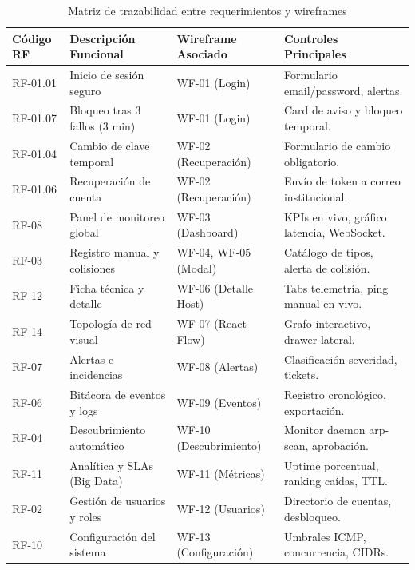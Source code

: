 \documentclass[12pt,a4paper]{report}
\begin{document}
\begin{table}[htbp]
\centering
\caption{Matriz de trazabilidad entre requerimientos y wireframes}\label{tab:matriz_trazabilidad_ui}
\footnotesize
\begin{tabularx}{\textwidth}{p{2.0cm} p{4.8cm} p{3.2cm} X}
\toprule
\textbf{Código RF} & \textbf{Descripción Funcional} & \textbf{Wireframe Asociado} & \textbf{Controles Principales} \\
\midrule
RF-01.01 & Inicio de sesión seguro & WF-01 (Login) & Formulario email/password, alertas. \\
\midrule
RF-01.07 & Bloqueo tras 3 fallos (3 min) & WF-01 (Login) & Card de aviso y bloqueo temporal. \\
\midrule
RF-01.04 & Cambio de clave temporal & WF-02 (Recuperación) & Formulario de cambio obligatorio. \\
\midrule
RF-01.06 & Recuperación de cuenta & WF-02 (Recuperación) & Envío de token a correo institucional. \\
\midrule
RF-08 & Panel de monitoreo global & WF-03 (Dashboard) & KPIs en vivo, gráfico latencia, WebSocket. \\
\midrule
RF-03 & Registro manual y colisiones & WF-04, WF-05 (Modal) & Catálogo de tipos, alerta de colisión. \\
\midrule
RF-12 & Ficha técnica y detalle & WF-06 (Detalle Host) & Tabs telemetría, ping manual en vivo. \\
\midrule
RF-14 & Topología de red visual & WF-07 (React Flow) & Grafo interactivo, drawer lateral. \\
\midrule
RF-07 & Alertas e incidencias & WF-08 (Alertas) & Clasificación severidad, tickets. \\
\midrule
RF-06 & Bitácora de eventos y logs & WF-09 (Eventos) & Registro cronológico, exportación. \\
\midrule
RF-04 & Descubrimiento automático & WF-10 (Descubrimiento) & Monitor daemon arp-scan, aprobación. \\
\midrule
RF-11 & Analítica y SLAs (Big Data) & WF-11 (Métricas) & Uptime porcentual, ranking caídas, TTL. \\
\midrule
RF-02 & Gestión de usuarios y roles & WF-12 (Usuarios) & Directorio de cuentas, desbloqueo. \\
\midrule
RF-10 & Configuración del sistema & WF-13 (Configuración) & Umbrales ICMP, concurrencia, CIDRs. \\
\bottomrule
\end{tabularx}
\end{table}
\end{document}

